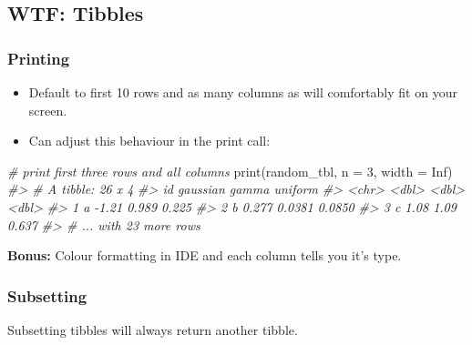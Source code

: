 \documentclass[
  12pt,
]{book}
\newenvironment{Shaded}{\begin{snugshade}}{\end{snugshade}}
\newcommand{\AttributeTok}[1]{\textcolor[rgb]{0.77,0.63,0.00}{#1}}
\newcommand{\CommentTok}[1]{\textcolor[rgb]{0.56,0.35,0.01}{\textit{#1}}}
\newcommand{\ConstantTok}[1]{\textcolor[rgb]{0.00,0.00,0.00}{#1}}
\newcommand{\DecValTok}[1]{\textcolor[rgb]{0.00,0.00,0.81}{#1}}
\newcommand{\FunctionTok}[1]{\textcolor[rgb]{0.00,0.00,0.00}{#1}}
\newcommand{\NormalTok}[1]{#1}
\begin{document}
\hypertarget{wtf-tibbles}{%
\subsection{WTF: Tibbles}\label{wtf-tibbles}}

\hypertarget{printing}{%
\subsubsection{Printing}\label{printing}}

\begin{itemize}
\item
  Default to first 10 rows and as many columns as will comfortably fit on your screen.
\item
  Can adjust this behaviour in the print call:
\end{itemize}

\begin{Shaded}
\begin{Highlighting}[]
\CommentTok{\# print first three rows and all columns}
\FunctionTok{print}\NormalTok{(random\_tbl, }\AttributeTok{n =} \DecValTok{3}\NormalTok{, }\AttributeTok{width =} \ConstantTok{Inf}\NormalTok{)}
\CommentTok{\#\textgreater{} \# A tibble: 26 x 4}
\CommentTok{\#\textgreater{}   id    gaussian  gamma uniform}
\CommentTok{\#\textgreater{}   \textless{}chr\textgreater{}    \textless{}dbl\textgreater{}  \textless{}dbl\textgreater{}   \textless{}dbl\textgreater{}}
\CommentTok{\#\textgreater{} 1 a       {-}1.21  0.989   0.225 }
\CommentTok{\#\textgreater{} 2 b        0.277 0.0381  0.0850}
\CommentTok{\#\textgreater{} 3 c        1.08  1.09    0.637 }
\CommentTok{\#\textgreater{} \# ... with 23 more rows}
\end{Highlighting}
\end{Shaded}

\textbf{Bonus:} Colour formatting in IDE and each column tells you it's type.

\hypertarget{subsetting}{%
\subsubsection{Subsetting}\label{subsetting}}

Subsetting tibbles will always return another tibble.
\end{document}

